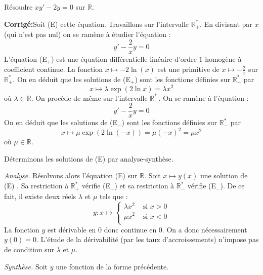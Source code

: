 \documentclass[a4paper,twoside,french,11pt]{VcCours}
\newcommand{\corr}{\textbf{Corrigé:}}
\begin{document}
\begin{Exercice}{} Résoudre $xy' -2y = 0$ sur $\mathbb{R}$.
\end{Exercice} 

\corr Soit (E) cette équation. Travaillons sur l'intervalle $\mathbb R_+^*$. En divisant par $x$ (qui n'est pas nul) on se ramène à étudier l'équation :
\begin{equation}
\tag{E$_+$}
y'  -\dfrac{2}{x}y = 0
\end{equation}
L'équation (E$_+$) est une équation différentielle  linéaire d'ordre $1$ homogène à coefficient continue. La fonction $x \mapsto -2\ln( x)$ est une primitive de $x \mapsto - \frac{2}{x}$ sur $\mathbb R_+^*$. On en déduit que les solutions de (E$_+$) sont les fonctions définies sur $\mathbb R_+^*$ par 
$$x \mapsto \lambda\exp(2\ln x) = \lambda x^2$$
où $\lambda \in \mathbb R$. On procède de même sur l'intervalle $\mathbb R_-^*$. On se ramène à l'équation :
\begin{equation}
\tag{E$_-$}
y'  -\dfrac{2}{x}y  = 0
\end{equation}
On en déduit que les solutions de (E$_-$) sont les fonctions définies sur $\mathbb R_-^*$ par 
$$x \mapsto \mu\exp(2\ln (-x)) = \mu(-x)^2 = \mu x^2$$
où $\mu \in \mathbb R$.

Déterminons les solutions de (E) par analyse-synthèse.


\textit{Analyse.} Résolvons alors l'équation (E) sur $\mathbb R$. Soit $x \mapsto y(x)$ une solution de (E) . Sa restriction à $\mathbb R_+^*$ vérifie (E$_+$) et sa restriction à $\mathbb R_-^*$ vérifie (E$_-$). De ce fait, il existe deux réels $\lambda$ et $\mu$ tels que :
$$y : x \mapsto \left\{\begin{array}{ll} \lambda x^2 & \text{ si } x > 0 \\ \mu x^2 & \text{ si } x < 0\\\end{array} \right.$$
La fonction $y$ est dérivable en $0$ donc continue en $0$. On a donc nécessairement $y(0)=0$. L'étude de la dérivabilité (par les taux d'accroissements) n'impose pas de condition sur $\lambda$ et $\mu$.


\textit{Synthèse.} Soit $y$ une fonction de la forme précédente.
\end{document}
